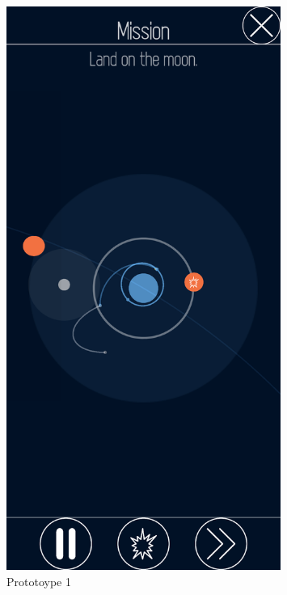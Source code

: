 \documentclass[runningheads]{llncs}
\begin{document}
\begin{figure}[!htb]
  \centering
  \begin{minipage}{.5\textwidth}
      \centering
      \includegraphics[width=0.8\textwidth]{Prototype1.png}
      \caption{Prototoype 1 \cite{ref_planeterProto1}}
      \label{fig:prot1}
  \end{minipage}%
  \begin{minipage}{0.5\textwidth}
      \centering

\end{minipage}
\end{figure}
\end{document}
